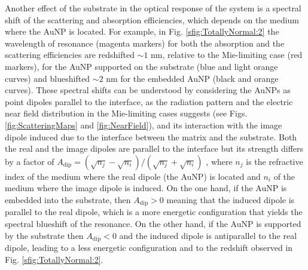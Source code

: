 Another effect of the substrate in the optical response of the system is a spectral shift of the scattering and absorption efficiencies, which depends on the medium where the AuNP is located. For example, in Fig. \ref{sfig:TotallyNormal:2} the wavelength of resonance (magenta markers) for both the absorption and the scattering efficiencies are redshifted $\sim 1$ nm, relative to the Mie-limiting case (red markers), for the AuNP supported on the substrate (blue and light orange curves) and blueshifted $\sim 2$ nm for the embedded AuNP (black and orange curves). These spectral shifts can be understood by considering the AuNPs as point dipoles parallel to the interface, as the radiation pattern and the electric near field distribution in the Mie-limiting cases suggests (see Figs. \ref{fig:ScatteringMaps} and  \ref{fig:NearField}), and its interaction with the image dipole induced due to the interface between the matrix and the substrate. Both the real and the image dipoles are parallel to the interface but its strength differs by  a factor of $A_\text{dip} = (\sqrt{n_j}-\sqrt{n_i}) / (\sqrt{n_j}+\sqrt{n_i})$ \cite{barrera1991optical}, where $n_{j}$ is the refractive index of the medium where the real dipole (the AuNP) is located and $n_i$ of the medium where the image dipole is induced. On the one hand, if the AuNP is embedded into the substrate, then $A_\text{dip}>0$ meaning that the induced dipole is parallel to the real dipole, which is a more energetic configuration that yields the spectral blueshift of the resonance. On the other hand, if the AuNP is supported by the substrate then $A_\text{dip}<0$ and the induced dipole is antiparallel to the real dipole, leading to a less energetic configuration and to the redshift observed in Fig. \ref{sfig:TotallyNormal:2}.%

